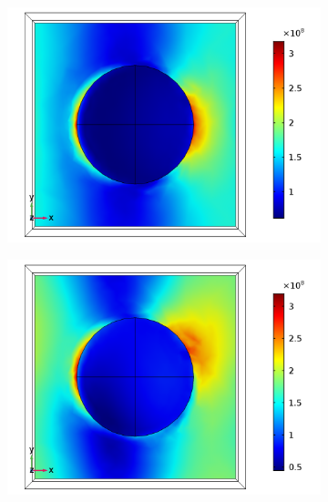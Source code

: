 \begin{figure}[htb!]
    \begin{subfigure}{0.32\textwidth}    %
        \centering
        \includegraphics[width=\linewidth]{figures/ch4/S5A/FieldDistribution/phi0-90/Sample5A_TM_Slice@z=0_wl=350_phi=0.png}
   \end{subfigure}
   \begin{subfigure}{0.32\textwidth}
        \centering
        \includegraphics[width=\linewidth]{figures/ch4/S5A/FieldDistribution/phi0-90/Sample5A_TM_Slice@z=0_wl=350_phi=25.png}
   \end{subfigure}
   \begin{subfigure}{0.32\textwidth}
        \centering

\end{subfigure}
\end{figure}
